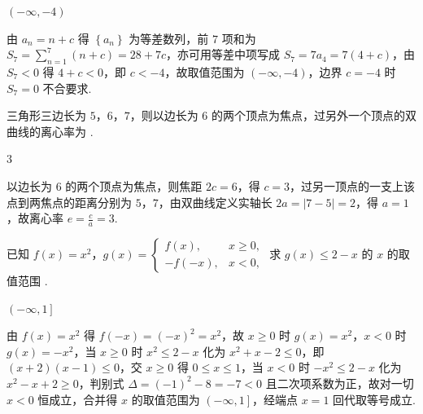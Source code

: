 \begin{answer}
\(\left(-\infty,-4\right)\)
\end{answer}

\begin{solution}
由 \(a_{n}=n+c\) 得 \(\left\{a_{n}\right\}\) 为等差数列，前 \(7\) 项和为 \(S_{7}=\sum_{n=1}^{7}\left(n+c\right)=28+7c\)，亦可用等差中项写成 \(S_{7}=7a_{4}=7\left(4+c\right)\)，由 \(S_{7}<0\) 得 \(4+c<0\)，即 \(c<-4\)，故取值范围为 \(\left(-\infty,-4\right)\)，边界 \(c=-4\) 时 \(S_{7}=0\) 不合要求.
\end{solution}

\begin{problem}
三角形三边长为 \(5\)，\(6\)，\(7\)，则以边长为 \(6\) 的两个顶点为焦点，过另外一个顶点的双曲线的离心率为\fillinblank{} .
\end{problem}

\begin{answer}
\(3\)
\end{answer}

\begin{solution}
以边长为 \(6\) 的两个顶点为焦点，则焦距 \(2c=6\)，得 \(c=3\)，过另一顶点的一支上该点到两焦点的距离分别为 \(5\)，\(7\)，由双曲线定义实轴长 \(2a=\left|7-5\right|=2\)，得 \(a=1\)，故离心率 \(e=\frac{c}{a}=3\).
\end{solution}

\begin{problem}
已知 \(f(x)=x^2\)，\(g(x)=\displaystyle\begin{cases}
f(x), & x\ge 0,\\
-f(-x), & x<0,
\end{cases}\) 求 \(g(x)\le 2-x\) 的 \(x\) 的取值范围\fillinblank{} .
\end{problem}

\begin{answer}
\(\left(-\infty,1\right]\)
\end{answer}

\begin{solution}
由 \(f\left(x\right)=x^{2}\) 得 \(f\left(-x\right)=\left(-x\right)^{2}=x^{2}\)，故 \(x\ge 0\) 时 \(g\left(x\right)=x^{2}\)，\(x<0\) 时 \(g\left(x\right)=-x^{2}\)，当 \(x\ge 0\) 时 \(x^{2}\le 2-x\) 化为 \(x^{2}+x-2\le 0\)，即 \(\left(x+2\right)\left(x-1\right)\le 0\)，交 \(x\ge 0\) 得 \(0\le x\le 1\)，当 \(x<0\) 时 \(-x^{2}\le 2-x\) 化为 \(x^{2}-x+2\ge 0\)，判别式 \(\Delta=\left(-1\right)^{2}-8=-7<0\) 且二次项系数为正，故对一切 \(x<0\) 恒成立，合并得 \(x\) 的取值范围为 \(\left(-\infty,1\right]\)，经端点 \(x=1\) 回代取等号成立.
\end{solution}

